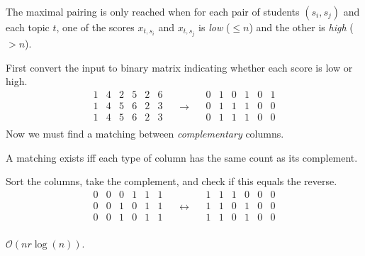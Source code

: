 \begin{frame}
    \frametitle{\problemtitle}
    \begin{description}
        \item<+->[Insight:] The maximal pairing is only reached when for each
          pair of students $(s_i, s_j)$ and each topic $t$, one of the scores $x_{t, s_i}$
          and $x_{t, s_j}$ is \emph{low} ($\leq n$) and the other is \emph{high} ($> n$).
        \item<+->[Solution:] First convert the input to binary matrix indicating whether
          each score is low or high.
          $$
          \begin{matrix}
            1 & 4 & 2 & 5 & 2 & 6\\
            1 & 4 & 5 & 6 & 2 & 3\\
            1 & 4 & 5 & 6 & 2 & 3\\
        \end{matrix}
          \quad \longrightarrow \quad
          \begin{matrix}
            0 & 1 & 0 & 1 & 0 & 1\\
            0 & 1 & 1 & 1 & 0 & 0\\
            0 & 1 & 1 & 1 & 0 & 0\\
        \end{matrix}
          $$
          Now we must find a matching between \emph{complementary} columns.
        \item<+->[] A matching exists iff each type of column has the same count as its complement.
        \item<+->[Cute trick:] Sort the columns, take the complement, and check
          if this equals the reverse.
          $$
          \begin{matrix}
            0 & 0 & 0 & 1 & 1 & 1\\
            0 & 0 & 1 & 0 & 1 & 1\\
            0 & 0 & 1 & 0 & 1 & 1\\
        \end{matrix}
          \quad \longleftrightarrow \quad
          \begin{matrix}
            1 & 1 & 1 & 0 & 0 & 0\\
            1 & 1 & 0 & 1 & 0 & 0\\
            1 & 1 & 0 & 1 & 0 & 0\\
        \end{matrix}
          $$
      \item<+->[Run time:] $\mathcal O(nr \log(n))$.
    \end{description}
    \solvestats
\end{frame}
